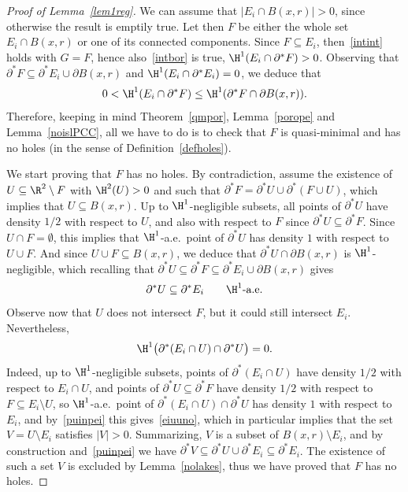 \begin{proof}[Proof of Lemma~\ref{lem1reg}]
We can assume that $|E_i\cap B(x,r)|>0$, since otherwise the result is emptily true. Let then $F$ be either the whole set $E_i\cap B(x,r)$ or one of its connected components. Since $F\subseteq E_i$, then~\eqref{intint} holds with $G=F$, hence also~\eqref{intbor} is true, \ie $\H^1(E_i \cap \partial^* F)>0$. Observing that $\partial^* F\subseteq \partial^* E_i \cup \partial B(x,r)$ and $\H^1(E_i\cap\partial^* E_i)=0$, we deduce that
\[
0<\H^1(E_i \cap\partial^* F)\leq\H^1(\partial^* F\cap \partial B(x,r)).
\]
Therefore, keeping in mind Theorem~\ref{qmpor}, Lemma~\ref{porope} and Lemma~\ref{noislPCC}, all we have to do is to check that $F$ is quasi-minimal and has no holes (in the sense of Definition~\ref{defholes}).

We start proving that $F$ has no holes. By contradiction, assume the existence of $U\subseteq\R^2\setminus F$ with $\H^2(U)>0$ and such that $\partial^* F =\partial^* U \cup \partial^*(F\cup U)$, which implies that $U\subseteq B(x,r)$. Up to $\H^1$-negligible subsets, all points of $\partial^* U$ have density $1/2$ with respect to $U$, and also with respect to $F$ since $\partial^* U \subseteq \partial^* F$. Since $U\cap F=\emptyset$, this implies that $\H^1$-a.e.\ point of $\partial^* U$ has density $1$ with respect to $U\cup F$. And since $U\cup F\subseteq B(x,r)$, we deduce that $\partial^* U\cap\partial B(x,r)$ is $\H^1$-negligible, which recalling that $\partial^* U \subseteq \partial^* F \subseteq \partial^* E_i \cup \partial B(x,r)$ gives
\begin{equation}\label{puinpei}
\partial^* U\subseteq \partial^* E_i \qquad \H^1\hbox{-a.e.}
\end{equation}
Observe now that $U$ does not intersect $F$, but it could still intersect $E_i$. Nevertheless,
\begin{equation}\label{eiuuno}
\H^1\big(\partial^*(E_i\cap U) \cap \partial^* U \big)=0.
\end{equation}
Indeed, up to $\H^1$-negligible subsets, points of $\partial^*(E_i \cap U)$ have density $1/2$ with respect to $E_i\cap U$, and points of $\partial^* U\subseteq \partial^* F$ have density $1/2$ with respect to $F\subseteq E_i\setminus U$, so $\H^1$-a.e.\ point of $\partial^*(E_i\cap U) \cap \partial^* U$ has density $1$ with respect to $E_i$, and by~\eqref{puinpei} this gives~\eqref{eiuuno}, which in particular implies that the set $V=U\setminus E_i$ satisfies $|V|>0$. Summarizing, $V$ is a subset of $B(x,r)\setminus E_i$, and by construction and~\eqref{puinpei} we have $\partial^* V\subseteq \partial^* U \cup \partial^* E_i\subseteq \partial^* E_i$. The existence of such a set $V$ is excluded by Lemma~\ref{nolakes}, thus we have proved that $F$ has no holes.


\end{proof}
